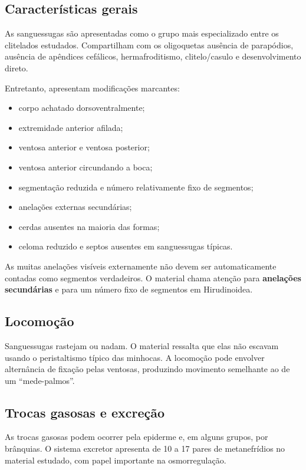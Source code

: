 \documentclass[a4paper,12pt]{article}
\begin{document}
\subsection{Características gerais}

As sanguessugas são apresentadas como o grupo mais especializado entre os clitelados estudados. Compartilham com os oligoquetas ausência de parapódios, ausência de apêndices cefálicos, hermafroditismo, clitelo/casulo e desenvolvimento direto.

Entretanto, apresentam modificações marcantes:

\begin{itemize}
  \item corpo achatado dorsoventralmente;
  \item extremidade anterior afilada;
  \item ventosa anterior e ventosa posterior;
  \item ventosa anterior circundando a boca;
  \item segmentação reduzida e número relativamente fixo de segmentos;
  \item anelações externas secundárias;
  \item cerdas ausentes na maioria das formas;
  \item celoma reduzido e septos ausentes em sanguessugas típicas.
\end{itemize}

\begin{conceito}
As muitas anelações visíveis externamente não devem ser automaticamente contadas como segmentos verdadeiros. O material chama atenção para \textbf{anelações secundárias} e para um número fixo de segmentos em Hirudinoidea.
\end{conceito}

\subsection{Locomoção}

Sanguessugas rastejam ou nadam. O material ressalta que elas não escavam usando o peristaltismo típico das minhocas. A locomoção pode envolver alternância de fixação pelas ventosas, produzindo movimento semelhante ao de um ``mede-palmos''.

\subsection{Trocas gasosas e excreção}

As trocas gasosas podem ocorrer pela epiderme e, em alguns grupos, por brânquias. O sistema excretor apresenta de 10 a 17 pares de metanefrídios no material estudado, com papel importante na osmorregulação.
\end{document}
